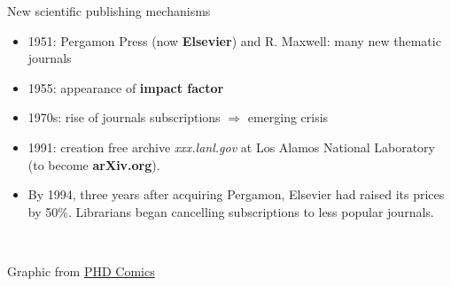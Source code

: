\documentclass[10pt,compress,serif,aspectratio=169]{beamer}
\begin{document}
 \begin{frame}[t]{New scientific publishing mechanisms}
\begin{itemize}

 \item 1951: Pergamon Press (now \textbf{Elsevier}) and R. Maxwell: many new thematic journals
 \item 1955: appearance of \textbf{impact factor}
 \item 1970s: rise of journals subscriptions $\Rightarrow$ emerging crisis
 \item 1991: creation free archive \textit{xxx.lanl.gov} at Los Alamos National Laboratory (to become \textbf{arXiv.org}).
\item By 1994, three years after acquiring Pergamon, Elsevier had raised its prices by 50\%. Librarians began cancelling subscriptions to less popular journals.
\end{itemize}

\hspace{1cm}
\\
  \begin{center}
    \small
    Graphic from \href{http://www.phdcomics.com/comics.php?f=1533}{PHD Comics}
  \end{center}
\end{frame}
\end{document}
